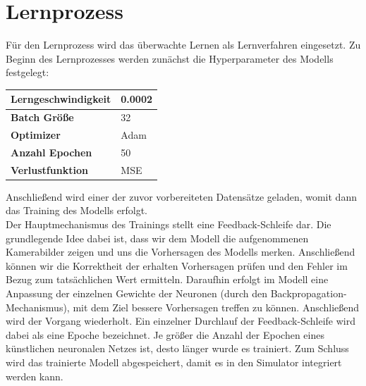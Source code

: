 \section{Lernprozess}

Für den Lernprozess wird das überwachte Lernen als Lernverfahren eingesetzt. Zu Beginn des Lernprozesses werden zunächst die Hyperparameter des Modells festgelegt:
\vspace{-0.4cm}
\begin{center}
	\begin{tabular}[t]{|l|l|}
		\hline
		\textbf{Lerngeschwindigkeit} & 0.0002 \\
		\hline
		\textbf{Batch Größe} & 32 \\
		\hline
		\textbf{Optimizer} & Adam \\
		\hline
		\textbf{Anzahl Epochen} & 50 \\
		\hline
		\textbf{Verlustfunktion} & MSE \\
		\hline
	\end{tabular}
\end{center}

Anschließend wird einer der zuvor vorbereiteten Datensätze geladen, womit dann das Training des Modells erfolgt. \\

Der Hauptmechanismus des Trainings stellt eine Feedback-Schleife dar. Die grundlegende Idee dabei ist, dass wir dem Modell die aufgenommenen Kamerabilder zeigen und uns die Vorhersagen des Modells merken. Anschließend können wir die Korrektheit der erhalten Vorhersagen prüfen und den Fehler im Bezug zum tatsächlichen Wert ermitteln. Daraufhin erfolgt im Modell eine Anpassung der einzelnen Gewichte der Neuronen (durch den Backpropagation-Mechanismus), mit dem Ziel bessere Vorhersagen treffen zu können. Anschließend wird der Vorgang wiederholt. Ein einzelner Durchlauf der  Feedback-Schleife wird dabei als eine Epoche bezeichnet. Je größer die Anzahl der Epochen eines künstlichen neuronalen Netzes ist, desto länger wurde es trainiert. Zum Schluss wird das trainierte Modell abgespeichert, damit es in den Simulator integriert werden kann.

